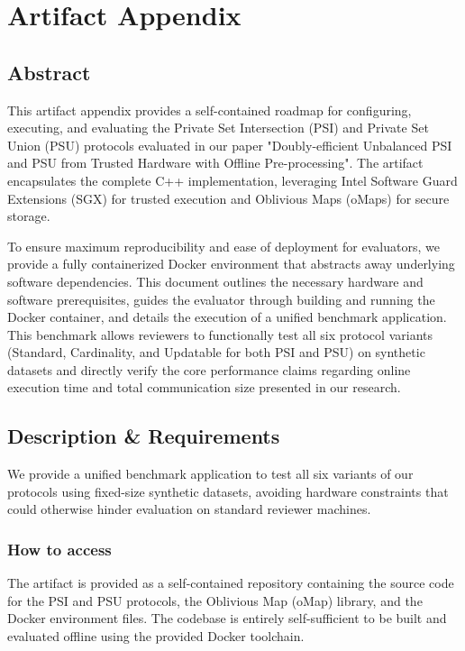 \documentclass[conference]{IEEEtran}
\begin{document}

\appendices
\section{Artifact Appendix}
\subsection{Abstract}
This artifact appendix provides a self-contained roadmap for configuring, executing, and evaluating the Private Set Intersection (PSI) and Private Set Union (PSU) protocols evaluated in our paper "Doubly-efficient Unbalanced  PSI and PSU from Trusted Hardware with Offline Pre-processing". The artifact encapsulates the complete C++ implementation, leveraging Intel Software Guard Extensions (SGX) for trusted execution and Oblivious Maps (oMaps) for secure storage. 

To ensure maximum reproducibility and ease of deployment for evaluators, we provide a fully containerized Docker environment that abstracts away underlying software dependencies. This document outlines the necessary hardware and software prerequisites, guides the evaluator through building and running the Docker container, and details the execution of a unified benchmark application. This benchmark allows reviewers to functionally test all six protocol variants (Standard, Cardinality, and Updatable for both PSI and PSU) on synthetic datasets and directly verify the core performance claims regarding online execution time and total communication size presented in our research.

\subsection{Description \& Requirements}
 We provide a unified benchmark application to test all six variants of our protocols using fixed-size synthetic datasets, avoiding hardware constraints that could otherwise hinder evaluation on standard reviewer machines.

\subsubsection{How to access}
The artifact is provided as a self-contained repository containing the source code for the PSI and PSU protocols, the Oblivious Map (oMap) library, and the Docker environment files. The codebase is entirely self-sufficient to be built and evaluated offline using the provided Docker toolchain.
\end{document}
